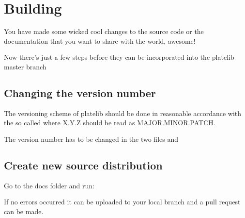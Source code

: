 \documentclass[letterpaper,10pt,english]{sphinxmanual}
\begin{document}
\section{Building}
\label{\detokenize{contribute:building}}
You have made some wicked cool changes to the source code
or the documentation that you want to share with the world, awesome!

Now there’s just a few steps before they can be incorporated into
the platelib master branch


\subsection{Changing the version number}
\label{\detokenize{contribute:changing-the-version-number}}
The versioning scheme of platelib should be done in reasonable
accordance with the so called  where
X.Y.Z should be read as MAJOR.MINOR.PATCH.

The version number has to be changed in the two files  and


\subsection{Create new source distribution}
\label{\detokenize{contribute:create-new-source-distribution}}
Go to the docs folder and run:

%
\begin{sphinxVerbatim}[commandchars=\\\{\}]
\end{sphinxVerbatim}

If no errors occurred it can be uploaded to your local branch and
a pull request can be made.
\end{document}
